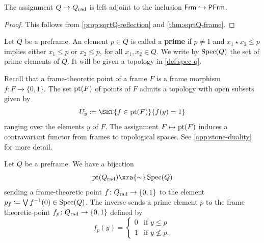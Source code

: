 \documentclass[10pt,a4paper,oneside]{article}
\begin{document}
\begin{cor}\label{cor:preframe}
The assignment $Q \mapsto Q_{\operatorname{rad}}$ is left adjoint to the inclusion $\mathsf{Frm} \hookrightarrow \mathsf{PFrm}$.
\end{cor}

\begin{proof}
This follows from \cref{prop:sqrtQ-reflection} and \cref{thm:sqrtQ-frame}.
\end{proof}

\begin{de}\label{def:prime}
Let $Q$ be a preframe. An element $p \in Q$ is called a \textbf{prime} if $p\neq1$ and $x_1 \star x_2 \le p$ implies either $x_1 \le p$ or $x_2 \le p$, for all $x_1, x_2 \in Q$. We write by $\operatorname{Spec}(Q)$ the set of prime elements of $Q$. It will be given a topology in \cref{def:spec-q}.
\end{de}

\begin{rem}
Recall that a frame-theoretic point of a frame $F$ is a frame morphism $f\colon F \to \{0,1\}$. The set $\operatorname{pt}(F)$ of points of $F$ admits a topology with open subsets given by $$U_y \coloneqq \SET{f\in \op{pt}(F)}{f(y)=1}$$
ranging over the elements $y$ of $F$. The assignment $F\mapsto\operatorname{pt}(F)$ induces a contravariant functor from frames to topological spaces. See \cref{app:stone-duality} for more detail.
\end{rem}

\begin{thm}\label{thm:specQ}
Let $Q$ be a preframe. We have a bijection
\[
\op{pt}(Q_{\op{rad}}) \xra{\sim} \spec(Q)
\]
sending a frame-theoretic point $f\colon Q_{\operatorname{rad}} \to \{0,1\}$ to the element $p_f \coloneq \bigvee f^{-1}(0) \in \operatorname{Spec}(Q)$. The inverse sends a prime element $p$ to the frame theoretic-point $f_p\colon Q_{\operatorname{rad}} \to \{0,1\}$ defined by
\[
f_p(y) =
\begin{cases}
0 & \text{if } y \le p \\
1 & \text{if } y \not\le p.
\end{cases}
\]
\end{thm}
\end{document}

